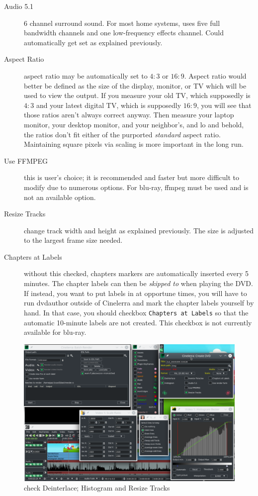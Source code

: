 \begin{description}
    \item[Audio 5.1] 6 channel surround sound.  For most home systems, uses five full bandwidth channels and one low-frequency effects channel.  Could automatically get set as explained previously.
    \item[Aspect Ratio] aspect ratio may be automatically set to $4:3$ or $16:9$.  Aspect ratio would better be defined as the size of the display, monitor, or TV which will be used to view the output.  If you measure your old TV, which supposedly is $4:3$ and your latest digital TV, which is supposedly $16:9$, you will see that those ratios aren't always correct anyway.  Then measure your laptop monitor, your desktop monitor, and your neighbor's, and lo and behold, the ratios don't fit either of the purported \textit{standard} aspect ratio.  Maintaining square pixels via scaling is more important in the long run.
    \item[Use FFMPEG] this is user's choice; it is recommended and faster but more difficult to modify due to numerous options. For blu-ray, ffmpeg must be used and is not an available option.
    \item[Resize Tracks] change track width and height as explained previously.  The size is adjusted to the largest frame size needed.
    \item[Chapters at Labels] without this checked, chapters markers are automatically inserted every 5 minutes.  The chapter labels can then be \textit{skipped to} when playing the DVD.  If instead, you want to put labels in at opportune times, you will have to run dvdauthor outside of Cinelerra and mark the chapter labels yourself by hand.  In that case, you should checkbox \texttt{Chapters at Labels} so that the automatic 10-minute labels are not created.  This checkbox is not currently available for blu-ray.
\end{description}

\begin{figure}[htpb]
    \centering
    \includegraphics[width=0.9\linewidth]{images/dvd02.png}
    \caption{check Deinterlace; Histogram and Resize Tracks}
    \label{fig:dvd02}
\end{figure}

